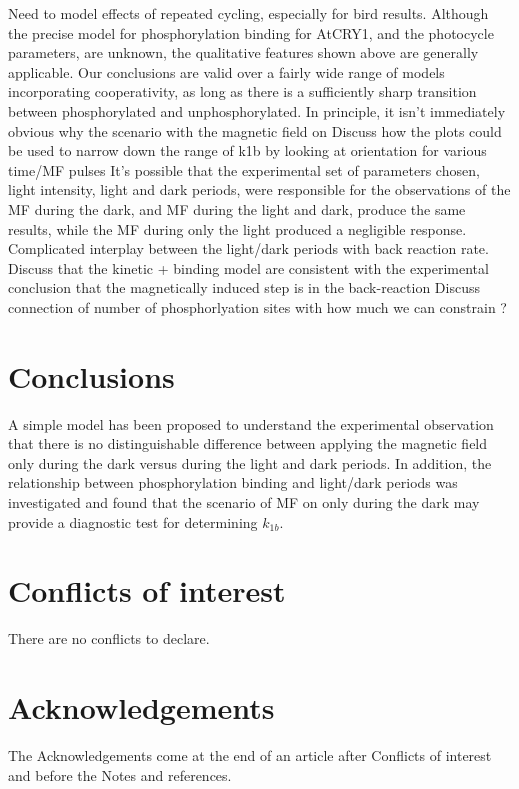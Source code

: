 \documentclass[twoside,twocolumn,9pt]{article}
\renewcommand{\refname}{Notes and references}
\begin{document}
Need to model effects of repeated cycling, especially for bird results.
Although the precise model for phosphorylation binding for AtCRY1, and the photocycle parameters, are unknown, the qualitative
features shown above are generally applicable. Our conclusions are valid over a fairly wide range of models incorporating
cooperativity, as long as there is a sufficiently sharp transition between phosphorylated and unphosphorylated. In principle, it
isn't immediately obvious why the scenario with the magnetic field on
Discuss how the plots could be used to narrow down the range of k1b by looking at orientation for various time/MF pulses
It's possible that the experimental set of parameters chosen, light intensity, light and dark periods, were responsible for the
observations of the MF during the dark, and MF during the light and dark, produce the same results, while the MF during only the
light produced a negligible response.
Complicated interplay between the light/dark periods with back reaction rate.
Discuss that the kinetic + binding model are consistent with the experimental conclusion that the magnetically induced step is in
the back-reaction
Discuss connection of number of phosphorlyation sites with how much we can constrain ?

\section{Conclusions}
A simple model has been proposed to  understand the experimental observation that there is no distinguishable difference between
applying the magnetic field only during the dark versus during the light and dark periods. In addition, the relationship between
phosphorylation binding and light/dark periods was investigated and found that the scenario of MF on only during the dark may
provide a diagnostic test for determining $k_{1b}$.

\section*{Conflicts of interest}
There are no conflicts to declare.

\section*{Acknowledgements}
The Acknowledgements come at the end of an article after Conflicts of interest and before the Notes and references.



\balance



\end{document}
